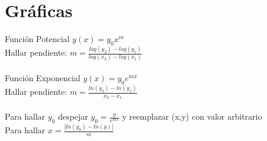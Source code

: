 \documentclass[14pt]{extarticle}
\begin{document}
	\section*{\normalsize Gráficas}
	Función Potencial $y(x) = y_0x^m$ \\
	Hallar pendiente: $ m = \frac{log(y_2) - log(y_1)}{log(x_2) - log(x_1)}$\\\\
	Función Exponencial $y(x) = y_0e^{mx}$ \\
	Hallar pendiente: $m = \frac{ln(y_2) - ln(y_1)}{x_2 - x_1}$\\\\
	Para hallar $y_0$ despejar $y_0 = \frac{y}{e^{mx}}$ y reemplazar (x,y) con valor arbitrario\\
	Para hallar $x = \frac{|ln(y_0) - ln(y)|}{m}$
	
\end{document}
